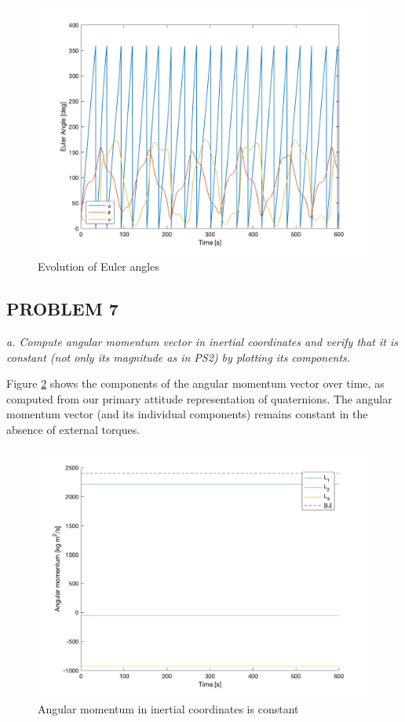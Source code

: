 \begin{figure}[H]
\centering
\includegraphics[scale=0.6]{Images/ps3_problem6_euler.png}
\caption{Evolution of Euler angles}
\label{fig:ps3_problem6_euler}
\end{figure}

\subsection{PROBLEM 7}
\textit{a. Compute angular momentum vector in inertial coordinates and verify that it is constant (not only its magnitude as in PS2) by plotting its components.}

Figure \ref{fig:ps3_problem7a} shows the components of the angular momentum vector over time, as computed from our primary attitude representation of quaternions. The angular momentum vector (and its individual components) remains constant in the absence of external torques.

\begin{figure}[H]
\centering
\includegraphics[scale=0.6]{Images/ps3_problem7a.png}
\caption{Angular momentum in inertial coordinates is constant}
\label{fig:ps3_problem7a}
\end{figure}

